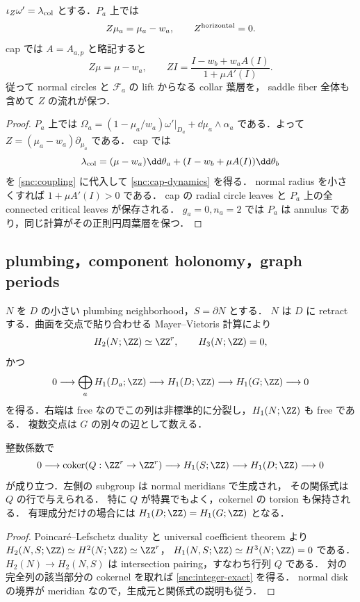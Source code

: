\begin{lemma}
\label{snc:collar-dynamics}
$\iota_Z\omega'=\lambda_{\rm col}$ とする．$P_a$ 上では
\[
 Z\mu_a=\mu_a-w_a,\qquad Z^{\rm horizontal}=0.
\]
cap では $A=A_{a,p}$ と略記すると
\begin{equation}\label{snc:cap-dynamics}
 Z\mu=\mu-w_a,\qquad
 ZI=\frac{I-w_b+w_aA(I)}{1+\mu A'(I)}.
\end{equation}
従って normal circles と $\mathcal F_a$ の lift からなる collar 葉層を，
saddle fiber 全体も含めて $Z$ の流れが保つ．
\end{lemma}
\begin{proof}
$P_a$ 上では
$\Omega_a=(1-\mu_a/w_a)\omega'|_{D_a}+\dd\mu_a\wedge\alpha_a$
である．よって $Z=(\mu_a-w_a)\partial_{\mu_a}$ である．
cap では
\[
 \lambda_{\rm col}=(\mu-w_a)\dd\theta_a+
     (I-w_b+\mu A(I))\dd\theta_b
\]
を \eqref{snc:coupling} に代入して \eqref{snc:cap-dynamics} を得る．
normal radius を小さくすれば $1+\mu A'(I)>0$ である．
cap の radial circle leaves と $P_a$ 上の全 connected critical leaves が保存される．
$g_a=0,n_a=2$ では $P_a$ は annulus であり，同じ計算がその正則円周葉層を保つ．
\end{proof}

\subsection{plumbing，component holonomy，graph periods}

$N$ を $D$ の小さい plumbing neighborhood，$S=\partial N$ とする．
$N$ は $D$ に retract する．曲面を交点で貼り合わせる Mayer--Vietoris 計算により
\[
 H_2(N;\ZZ)\simeq\ZZ^r,\qquad H_3(N;\ZZ)=0,
\]
かつ
\begin{equation}\label{snc:divisor-homology}
 0\longrightarrow\bigoplus_aH_1(D_a;\ZZ)
 \longrightarrow H_1(D;\ZZ)
 \longrightarrow H_1(G;\ZZ)\longrightarrow0
\end{equation}
を得る．右端は free なのでこの列は非標準的に分裂し，$H_1(N;\ZZ)$ も free である．
複数交点は $G$ の別々の辺として数える．

\begin{proposition}
\label{snc:integer-sequence}
整数係数で
\begin{equation}\label{snc:integer-exact}
 0\longrightarrow\operatorname{coker}(Q:\ZZ^r\to\ZZ^r)
 \longrightarrow H_1(S;\ZZ)
 \longrightarrow H_1(D;\ZZ)\longrightarrow0
\end{equation}
が成り立つ．左側の subgroup は normal meridians で生成され，
その関係式は $Q$ の行で与えられる．
特に $Q$ が特異でもよく，cokernel の torsion も保持される．
有理成分だけの場合には $H_1(D;\ZZ)=H_1(G;\ZZ)$ となる．
\end{proposition}
\begin{proof}
Poincaré--Lefschetz duality と universal coefficient theorem より
$H_2(N,S;\ZZ)\simeq H^2(N;\ZZ)\simeq\ZZ^r$，
$H_1(N,S;\ZZ)\simeq H^3(N;\ZZ)=0$ である．
$H_2(N)\to H_2(N,S)$ は intersection pairing，すなわち行列 $Q$ である．
対の完全列の該当部分の cokernel を取れば \eqref{snc:integer-exact} を得る．
normal disk の境界が meridian なので，生成元と関係式の説明も従う．
\end{proof}

